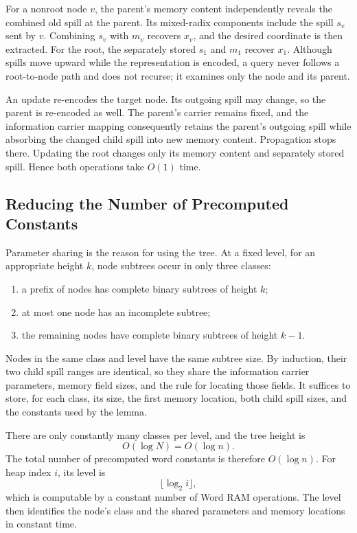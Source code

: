 For a nonroot node \(v\), the parent's memory content independently reveals
the combined old spill at the parent. Its mixed-radix components include the
spill \(s_v\) sent by \(v\). Combining \(s_v\) with \(m_v\) recovers \(x_v\),
and the desired coordinate is then extracted. For the root, the separately
stored \(s_1\) and \(m_1\) recover \(x_1\). Although spills move upward while
the representation is encoded, a query never follows a root-to-node path and
does not recurse; it examines only the node and its parent.

An update re-encodes the target node. Its outgoing spill may change, so the
parent is re-encoded as well. The parent's carrier remains fixed, and the
information carrier mapping consequently retains the parent's outgoing
spill while absorbing the changed child spill into new memory content.
Propagation stops there. Updating the root changes only its memory content
and separately stored spill. Hence both operations take \(O(1)\) time.

\subsection{Reducing the Number of Precomputed Constants}

Parameter sharing is the reason for using the tree. At a fixed level, for an
appropriate height \(k\), node subtrees occur in only three classes:
\begin{enumerate}[label=(\arabic*)]
    \item a prefix of nodes has complete binary subtrees of height \(k\);
    \item at most one node has an incomplete subtree;
    \item the remaining nodes have complete binary subtrees of height
          \(k-1\).
\end{enumerate}
Nodes in the same class and level have the same subtree size. By induction,
their two child spill ranges are identical, so they share the information
carrier parameters, memory field sizes, and the rule for locating those
fields. It suffices to store, for each class, its size, the first memory
location, both child spill sizes, and the constants used by the lemma.

There are only constantly many classes per level, and the tree height is
\[
    O(\log N)=O(\log n).
\]
The total number of precomputed word constants is therefore \(O(\log n)\).
For heap index \(i\), its level is
\[
    \lfloor\log_2 i\rfloor,
\]
which is computable by a constant number of Word RAM operations. The level
then identifies the node's class and the shared parameters and memory
locations in constant time.

